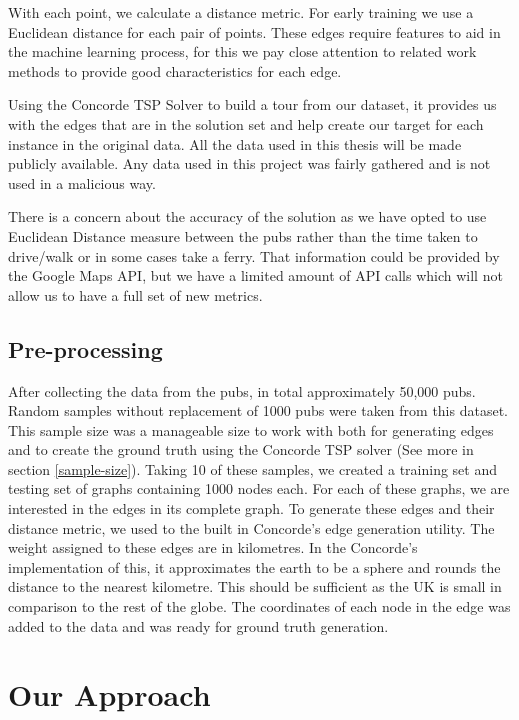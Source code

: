 \documentclass[]{UCD_CS_FYP_Report}
\begin{document}
With each point, we calculate a distance metric. For early training we use a Euclidean distance for each pair of points. These edges require features to aid in the machine learning process, for this we pay close attention to related work methods to provide good characteristics for each edge.

Using the Concorde TSP Solver \cite{davidapplegate2007} to build a tour from our dataset, it provides us with the edges that are in the solution set and help create our target for each instance in the original data.
All the data used in this thesis will be made publicly available. Any data used in this project was fairly gathered and is not used in a malicious way.

There is a concern about the accuracy of the solution as we have opted to use Euclidean Distance measure between the pubs rather than the time taken to drive/walk or in some cases take a ferry. That information could be provided by the Google Maps API, but we have a limited amount of API calls which will not allow us to have a full set of new metrics.

\section{Pre-processing}\label{pre-processing}
After collecting the data from the pubs, in total approximately 50,000 pubs. Random samples without replacement of 1000 pubs were taken from this dataset. This sample size was a manageable size to work with both for generating edges and to create the ground truth using the Concorde TSP solver (See more in section \ref{sample-size}). Taking 10 of these samples, we created a training set and testing set of graphs containing 1000 nodes each. For each of these graphs, we are interested in the edges in its complete graph. To generate these edges and their distance metric, we used to the built in Concorde’s edge generation utility. The weight assigned to these edges are in kilometres. In the Concorde’s implementation of this, it approximates the earth to be a sphere and rounds the distance to the nearest kilometre. This should be sufficient as the UK is small in comparison to the rest of the globe. The coordinates of each node in the edge was added to the data and was ready for ground truth generation.




\chapter{Our Approach}
\end{document}
